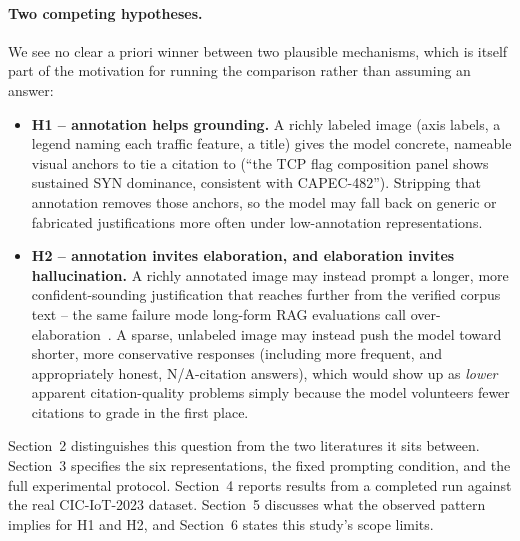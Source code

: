 \documentclass[twocolumn]{svjour3}
\begin{document}
\paragraph{Two competing hypotheses.} We see no clear a priori winner between two plausible
mechanisms, which is itself part of the motivation for running the comparison rather than assuming
an answer:

\begin{itemize}
\item \textbf{H1 -- annotation helps grounding.} A richly labeled image (axis labels, a legend
naming each traffic feature, a title) gives the model concrete, nameable visual anchors to tie a
citation to (``the TCP flag composition panel shows sustained SYN dominance, consistent with
CAPEC-482''). Stripping that annotation removes those anchors, so the model may fall back on
generic or fabricated justifications more often under low-annotation representations.
\item \textbf{H2 -- annotation invites elaboration, and elaboration invites hallucination.} A
richly annotated image may instead prompt a longer, more confident-sounding justification that
reaches further from the verified corpus text -- the same failure mode long-form RAG evaluations
call over-elaboration~\cite{factum2026}. A sparse, unlabeled image may instead push the model toward
shorter, more conservative responses (including more frequent, and appropriately honest,
N/A-citation answers), which would show up as \emph{lower} apparent citation-quality problems simply
because the model volunteers fewer citations to grade in the first place.
\end{itemize}

Section~2 distinguishes this question from the two literatures it sits between.
Section~3 specifies the six representations, the fixed prompting condition, and the
full experimental protocol. Section~4 reports results from a completed run against
the real CIC-IoT-2023 dataset. Section~5 discusses what the observed pattern
implies for H1 and H2, and Section~6 states this study's scope limits.
\end{document}
